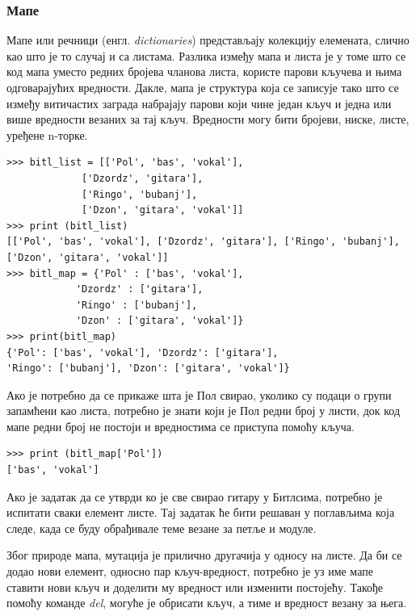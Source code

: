 \subsubsection{Мапе}\label{subsec:maps}
Мапе или речници (енгл. \emph{dictionaries}) представљају колекцију елемената, слично као што је то случај и са листама. Разлика између мапа и листа је у томе што се код мапа уместо редних бројева чланова листа, користе парови кључева и њима одговарајућих вредности. Дакле, мапа је структура која се записује тако што се између витичастих заграда набрајају парови који чине један кључ и једна или више вредности везаних за тај кључ. Вредности могу бити бројеви, ниске, листе, уређене n-торке.

\begin{lstlisting}[caption = Разлика између листе и мапе, label = map_vs_list]
>>> bitl_list = [['Pol', 'bas', 'vokal'],
	         ['Dzordz', 'gitara'],
	         ['Ringo', 'bubanj'],
	         ['Dzon', 'gitara', 'vokal']]
>>> print (bitl_list)
[['Pol', 'bas', 'vokal'], ['Dzordz', 'gitara'], ['Ringo', 'bubanj'],
['Dzon', 'gitara', 'vokal']]
>>> bitl_map = {'Pol' : ['bas', 'vokal'],
	        'Dzordz' : ['gitara'],
	        'Ringo' : ['bubanj'],
	        'Dzon' : ['gitara', 'vokal']}
>>> print(bitl_map)
{'Pol': ['bas', 'vokal'], 'Dzordz': ['gitara'],
'Ringo': ['bubanj'], 'Dzon': ['gitara', 'vokal']}
\end{lstlisting}

Ако је потребно да се прикаже шта је Пол свирао, уколико су подаци о групи запамћени као листа, потребно је знати који је Пол редни број у листи, док код мапе редни број не постоји и вредностима се приступа помоћу кључа.

\begin{lstlisting}[caption = Кључ и вредност, label = key_value]
>>> print (bitl_map['Pol'])
['bas', 'vokal']
\end{lstlisting}

Ако је задатак да се утврди ко је све свирао гитару у Битлсима, потребно је испитати сваки елемент листе. Тај задатак ће бити решаван у поглављима која следе, када се буду обрађивале теме везане за петље и модуле.

Због природе мапа, мутација је прилично другачија у односу на листе. Да би се додао нови елемент, односно пар кључ-вредност, потребно је уз име мапе ставити нови кључ и доделити му вредност или изменити постојећу. Такође помоћу команде \emph{del}, могуће је обрисати кључ, а тиме и вредност везану за њега.

